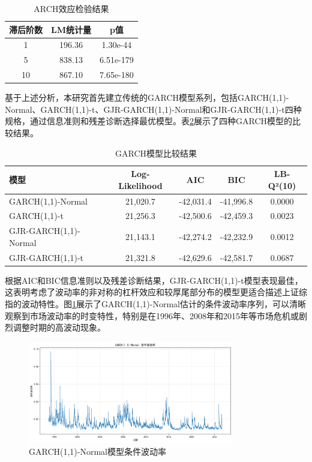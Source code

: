 \documentclass[12pt, a4paper]{article}
\begin{document}
\begin{table}[htbp]
\centering
\caption{ARCH效应检验结果}
\label{tab:arch_effect}
\begin{tabular}{ccc}
\toprule
滞后阶数 & LM统计量 & p值 \\
\midrule
1 & 196.36 & 1.30e-44 \\
5 & 838.13 & 6.51e-179 \\
10 & 867.10 & 7.65e-180 \\
\bottomrule
\end{tabular}
\end{table}

基于上述分析，本研究首先建立传统的GARCH模型系列，包括GARCH(1,1)-Normal、GARCH(1,1)-t、GJR-GARCH(1,1)-Normal和GJR-GARCH(1,1)-t四种规格，通过信息准则和残差诊断选择最优模型。表\ref{tab:garch_models}展示了四种GARCH模型的比较结果。

\begin{table}[htbp]
\centering
\caption{GARCH模型比较结果}
\label{tab:garch_models}
\begin{tabular}{lcccc}
\toprule
模型 & Log-Likelihood & AIC & BIC & LB-Q²(10) \\
\midrule
GARCH(1,1)-Normal & 21,020.7 & -42,031.4 & -41,996.8 & 0.0000 \\
GARCH(1,1)-t & 21,256.3 & -42,500.6 & -42,459.3 & 0.0023 \\
GJR-GARCH(1,1)-Normal & 21,143.1 & -42,274.2 & -42,232.9 & 0.0012 \\
GJR-GARCH(1,1)-t & 21,321.8 & -42,629.6 & -42,581.7 & 0.0687 \\
\bottomrule
\end{tabular}
\end{table}

根据AIC和BIC信息准则以及残差诊断结果，GJR-GARCH(1,1)-t模型表现最佳，这表明考虑了波动率的非对称的杠杆效应和较厚尾部分布的模型更适合描述上证综指的波动特性。图\ref{fig:garch_cond_vol}展示了GARCH(1,1)-Normal估计的条件波动率序列，可以清晰观察到市场波动率的时变特性，特别是在1996年、2008年和2015年等市场危机或剧烈调整时期的高波动现象。

\begin{figure}[htbp]
\centering
\includegraphics[width=0.8\textwidth]{./img/GARCH条件波动率.png}
\caption{GARCH(1,1)-Normal模型条件波动率}
\label{fig:garch_cond_vol}
\end{figure}
\end{document}
